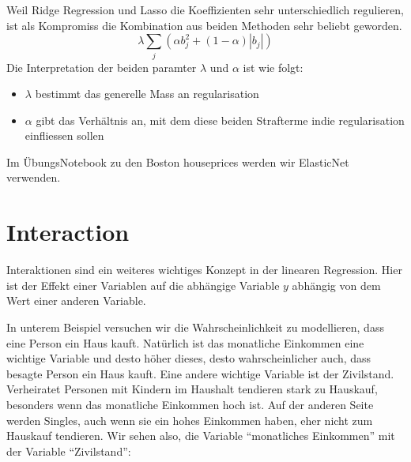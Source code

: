 \documentclass[letterpaper,10pt,english]{jupyterBook}
\begin{document}
\sphinxAtStartPar
Weil Ridge Regression und Lasso die Koeffizienten sehr unterschiedlich regulieren, ist als Kompromiss die Kombination aus beiden Methoden sehr beliebt geworden.
\begin{equation*}
\lambda\sum_j (\alpha b_j^2 + (1-\alpha)|b_j|)
\end{equation*}
\sphinxAtStartPar
Die Interpretation der beiden paramter \(\lambda\) und \(\alpha\) ist wie folgt:
\begin{itemize}
\item {} 
\sphinxAtStartPar
\(\lambda\) bestimmt das generelle Mass an regularisation

\item {} 
\sphinxAtStartPar
\(\alpha\) gibt das Verhältnis an, mit dem diese beiden Strafterme indie regularisation einfliessen sollen


\end{itemize}

\sphinxAtStartPar
Im Übungs\sphinxhyphen{}Notebook zu den Boston house\sphinxhyphen{}prices werden wir ElasticNet verwenden.


\chapter{Interaction}
\label{\detokenize{Regression_Techniques:interaction}}
\sphinxAtStartPar
Interaktionen sind ein weiteres wichtiges Konzept in der linearen Regression. Hier ist der Effekt einer Variablen auf die abhängige Variable \(y\) abhängig von dem Wert einer anderen Variable.

\sphinxAtStartPar
In unterem Beispiel versuchen wir die Wahrscheinlichkeit zu modellieren, dass eine Person ein Haus kauft. Natürlich ist das monatliche Einkommen eine wichtige Variable und desto höher dieses, desto wahrscheinlicher auch, dass besagte Person ein Haus kauft. Eine andere wichtige Variable ist der Zivilstand. Verheiratet Personen mit Kindern im Haushalt tendieren stark zu Hauskauf, besonders wenn das monatliche Einkommen hoch ist. Auf der anderen Seite werden Singles, auch wenn sie ein hohes Einkommen haben, eher nicht zum Hauskauf tendieren.
Wir sehen also, die Variable “monatliches Einkommen”  mit der Variable “Zivilstand”:

\noindent{}
\end{document}
